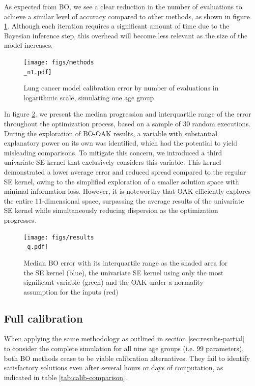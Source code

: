 \documentclass[sn-mathphys,Numbered]{sn-jnl}%
\begin{document}
As expected from BO, we see a clear reduction in the number of evaluations to achieve a similar level of accuracy compared to other methods, as shown in figure \ref{fig:method_comparison}. Although each iteration requires a significant amount of time due to the Bayesian inference step, this overhead will become less relevant as the size of the model increases.

\begin{figure}[h!]
	\centering	
	\texttt{[image: figs/methods\\\_n1.pdf]}		
	\caption{Lung cancer model calibration error by number of evaluations in logarithmic scale, simulating one age group}
	\label{fig:method_comparison}	
\end{figure}

In figure \ref{fig:results_oak}, we present the median progression and interquartile range of the error throughout the optimization process, based on a sample of 30 random executions.  During the exploration of BO-OAK results, a variable with substantial explanatory power on its own was identified, which had the potential to yield misleading comparisons. To mitigate this concern, we introduced a third univariate SE kernel that exclusively considers this variable. This kernel demonstrated a lower average error and reduced spread compared to the regular SE kernel, owing to the simplified exploration of a smaller solution space with minimal information loss. However, it is noteworthy that OAK efficiently explores the entire 11-dimensional space, surpassing the average results of the univariate SE kernel while simultaneously reducing dispersion as the optimization progresses.

\begin{figure}[h!]
	\centering	
	\texttt{[image: figs/results\\\_q.pdf]}		
	\caption{Median BO error with its interquartile range as the shaded area for the SE kernel (blue), the univariate SE kernel using only the most significant variable (green) and the OAK under a normality assumption for the inputs (red)}
	\label{fig:results_oak}	
\end{figure}

\subsection{Full calibration}
When applying the same methodology as outlined in section \ref{sec:results-partial} to consider the complete simulation for all nine age groups (i.e. 99 parameters), both BO methods cease to be viable calibration alternatives. They fail to identify satisfactory solutions even after several hours or days of computation, as indicated in table \ref{tab:calib-comparison}.
\end{document}
